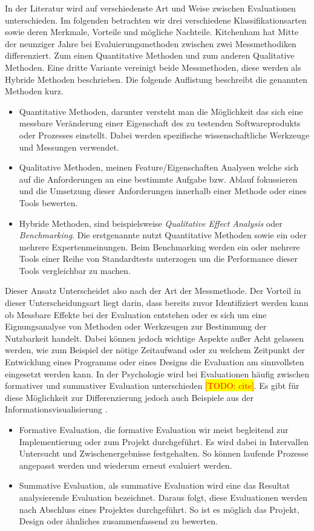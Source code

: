 \documentclass[draft=false
              ,paper=a4
              ,twoside=false
              ,fontsize=11pt
              ,headsepline
              ,BCOR10mm
              ,DIV11
              ]{scrbook}
\newcommand{\TODO}[1]{\colorbox{yellow}{\textcolor{red}{[TODO: #1]}}}
\begin{document}
In der Literatur wird auf verschiedenste Art und Weise zwischen Evaluationen unterschieden. Im folgenden betrachten wir drei verschiedene Klassifikationsarten sowie deren Merkmale, Vorteile und mögliche Nachteile.  
Kitchenham \cite{kitchenham_evaluating_1996-1} hat Mitte der neunziger Jahre bei Evaluierungsmethoden zwischen zwei Messmethodiken differenziert. Zum einen Quantitative Methoden und zum anderen Qualitative Methoden. Eine dritte Variante vereinigt beide Messmethoden, diese werden als Hybride Methoden beschrieben. Die folgende Auflistung beschreibt die genannten Methoden kurz.
\begin{itemize}
  \item Quantitative Methoden, darunter versteht man die Möglichkeit das sich eine messbare Veränderung einer Eigenschaft des zu testenden Softwareprodukts oder Prozesses einstellt. Dabei werden spezifische wissenschaftliche Werkzeuge und Messungen verwendet.
  \item Qualitative Methoden, meinen Feature/Eigenschaften Analysen welche sich auf die Anforderungen an eine bestimmte Aufgabe bzw. Ablauf fokussieren und die Umsetzung dieser Anforderungen innerhalb einer Methode oder eines Tools bewerten.
  \item Hybride Methoden, sind beispielsweise \textit{Qualitative Effect Analysis} oder \textit{Benchmarking}. Die erstgenannte nutzt Quantitative Methoden sowie ein oder mehrere Expertenmeinungen. Beim Benchmarking werden ein oder mehrere Tools einer Reihe von Standardtests unterzogen um die Performance dieser Tools vergleichbar zu machen.
\end{itemize}
Dieser Ansatz Unterscheidet also nach der Art der Messmethode. Der Vorteil in dieser Unterscheidungsart liegt darin, dass bereits zuvor Identifiziert werden kann ob Messbare Effekte bei der Evaluation entstehen oder es sich um eine Eignungsanalyse von Methoden oder Werkzeugen zur Bestimmung der Nutzbarkeit handelt. Dabei können jedoch wichtige Aspekte außer Acht gelassen werden, wie zum Beispiel der nötige Zeitaufwand oder zu welchem Zeitpunkt der Entwicklung eines Programms oder eines Designs die Evaluation am sinnvollsten eingesetzt werden kann. 
In der Psychologie wird bei Evaluationen häufig zwischen formativer und summativer Evaluation unterschieden \TODO{cite}. Es gibt für diese Möglichkeit zur Differenzierung jedoch auch Beispiele aus der Informationsvisualisierung \cite{andrews_evaluating_2006}. 
\begin{itemize}
  \item Formative Evaluation, die formative Evaluation wir meist begleitend zur Implementierung oder zum Projekt durchgeführt. Es wird dabei in Intervallen Untersucht und Zwischenergebnisse festgehalten. So können laufende Prozesse angepasst werden und wiederum erneut evaluiert werden.
  \item Summative Evaluation, als summative Evaluation wird eine das Resultat analysierende Evaluation bezeichnet. Daraus folgt, diese Evaluationen werden nach Abschluss eines Projektes durchgeführt. So ist es möglich das Projekt, Design oder ähnliches zusammenfassend zu bewerten.
\end{itemize}
\end{document}
